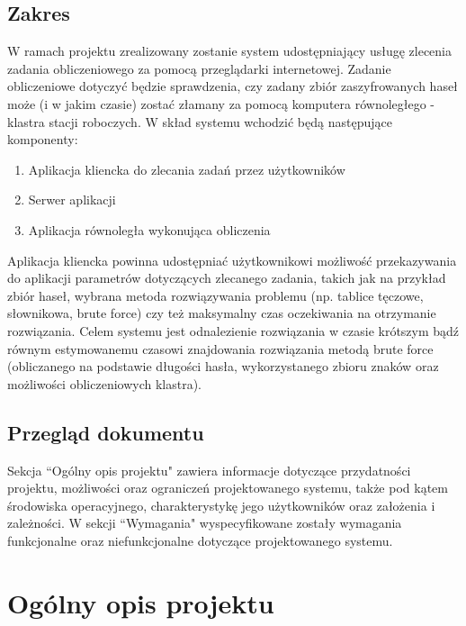 \documentclass[a4paper,10pt]{article}
\begin{document}
\subsection{Zakres}
W ramach projektu zrealizowany zostanie system udostępniający usługę zlecenia zadania obliczeniowego za pomocą przeglądarki internetowej. Zadanie obliczeniowe dotyczyć będzie sprawdzenia, czy zadany zbiór zaszyfrowanych haseł może (i w jakim czasie) zostać złamany za pomocą komputera równoległego - klastra stacji roboczych. W skład systemu wchodzić będą następujące komponenty:
\begin{enumerate}
\item Aplikacja kliencka do zlecania zadań przez użytkowników
\item Serwer aplikacji
\item Aplikacja równoległa wykonująca obliczenia
\end{enumerate}
Aplikacja kliencka powinna udostępniać użytkownikowi możliwość przekazywania do aplikacji parametrów dotyczących zlecanego zadania, takich jak na przykład zbiór haseł, wybrana metoda rozwiązywania problemu (np. tablice tęczowe, słownikowa, brute force) czy też maksymalny czas oczekiwania na otrzymanie rozwiązania. Celem systemu jest odnalezienie rozwiązania w czasie krótszym bądź równym estymowanemu czasowi znajdowania rozwiązania metodą brute force (obliczanego na podstawie długości hasła, wykorzystanego zbioru znaków oraz możliwości obliczeniowych klastra).
\subsection{Przegląd dokumentu}
Sekcja ``Ogólny opis projektu" zawiera informacje dotyczące przydatności projektu, możliwości oraz ograniczeń projektowanego systemu, także pod kątem środowiska operacyjnego, charakterystykę jego użytkowników oraz założenia i zależności.
W sekcji ``Wymagania" wyspecyfikowane zostały wymagania funkcjonalne oraz niefunkcjonalne dotyczące projektowanego systemu.
\section{Ogólny opis projektu}
\end{document}
